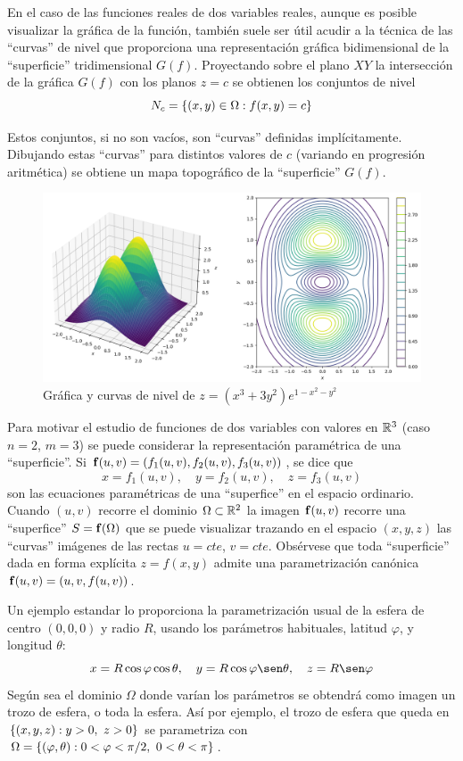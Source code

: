 En el caso de las funciones reales de dos variables reales, aunque es posible visualizar la gráfica de la función, también suele ser útil acudir a la técnica de las ``curvas'' de nivel que proporciona una representación gráfica bidimensional de la ``superficie'' tridimensional $G(f)$. Proyectando sobre el plano $XY$ la intersección de la gráfica $G(f)$ con los planos $z=c$ se obtienen los conjuntos de nivel
$$N_c=\left\lbrace (x,y)\in\Omega : f(x,y)=c\right\rbrace$$

Estos conjuntos, si no son vacíos, son ``curvas'' definidas implícitamente. Dibujando estas ``curvas'' para distintos valores de $c$ (variando en progresión aritmética) se obtiene un mapa topográfico de la ``superficie'' $G(f)$. 
\begin{figure}
    \centering
    \includegraphics[width=\linewidth]{img/graf1.png}
    \caption{ Gráfica y curvas de nivel de $z=(x^3+3y^2)e^{1-x^2-y^2}$ }
\end{figure}
Para motivar el estudio de funciones de dos variables con valores en $\mathbb{R}^3$ (caso $n=2$, $m=3$) se puede considerar la representación paramétrica de una ``superficie''. Si $\mathbf{f}(u,v)=(f_1(u,v), f_2(u,v), f_3(u,v))$, se dice que
$$x=f_1(u,v), \quad y=f_2(u,v), \quad z=f_3(u,v)$$
son las ecuaciones paramétricas de una ``superfice'' en el espacio ordinario. Cuando $(u,v)$ recorre el dominio $\Omega\subset\mathbb{R}^2$ la imagen $\mathbf{f}(u,v)$ recorre una ``superfice'' $S=\mathbf{f}(\Omega)$ que se puede visualizar trazando en el espacio $(x,y,z)$ las ``curvas'' imágenes de las rectas $u=cte$, $v=cte$. Obsérvese que toda ``superficie'' dada en forma explícita $z=f(x,y)$ admite una parametrización canónica $\mathbf{f}(u,v)=(u,v,f(u,v))$.

Un ejemplo estandar lo proporciona la parametrización usual de la esfera de centro $(0,0,0)$ y radio $R$, usando los parámetros habituales, latitud $\varphi$, y longitud $\theta$:
$$x=R\cos\varphi\cos\theta, \quad y=R\cos\varphi\sen\theta, \quad z=R\sen\varphi$$
Según sea el dominio $\Omega$ donde varían los parámetros se obtendrá como imagen un trozo de esfera, o toda la esfera. Así por ejemplo, el trozo de esfera que queda en $\left\lbrace(x,y,z): y>0, \ z>0\right\rbrace$ se parametriza con $\Omega=\left\lbrace(\varphi,\theta): 0<\varphi<\pi/2, \ 0<\theta<\pi\right\rbrace$.